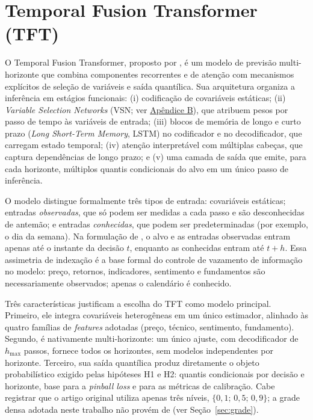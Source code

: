 \section{Temporal Fusion Transformer (TFT)} \label{sec:tft-teoria}
O Temporal Fusion Transformer, proposto por , é um modelo de previsão multi-horizonte que combina componentes recorrentes e de atenção com mecanismos explícitos de seleção de variáveis e saída quantílica. Sua arquitetura organiza a inferência em estágios funcionais: (i) codificação de covariáveis estáticas; (ii) \textit{Variable Selection Networks} (VSN; ver \hyperref[gl:vsn]{Apêndice B}), que atribuem pesos por passo de tempo às variáveis de entrada; (iii) blocos de memória de longo e curto prazo (\textit{Long Short-Term Memory}, LSTM) no codificador e no decodificador, que carregam estado temporal; (iv) atenção interpretável com múltiplas cabeças, que captura dependências de longo prazo; e (v) uma camada de saída que emite, para cada horizonte, múltiplos quantis condicionais do alvo em um único passo de inferência.

O modelo distingue formalmente três tipos de entrada: covariáveis estáticas; entradas \textit{observadas}, que só podem ser medidas a cada passo e são desconhecidas de antemão; e entradas \textit{conhecidas}, que podem ser predeterminadas (por exemplo, o dia da semana). Na formulação de , o alvo e as entradas observadas entram apenas até o instante da decisão \(t\), enquanto as conhecidas entram até \(t+h\). Essa assimetria de indexação é a base formal do controle de vazamento de informação no modelo: preço, retornos, indicadores, sentimento e fundamentos são necessariamente observados; apenas o calendário é conhecido.

Três características justificam a escolha do TFT como modelo principal. Primeiro, ele integra covariáveis heterogêneas em um único estimador, alinhado às quatro famílias de \textit{features} adotadas (preço, técnico, sentimento, fundamento). Segundo, é nativamente multi-horizonte: um único ajuste, com decodificador de \(h_{\max}\) passos, fornece todos os horizontes, sem modelos independentes por horizonte. Terceiro, sua saída quantílica produz diretamente o objeto probabilístico exigido pelas hipóteses H1 e H2: quantis condicionais por decisão e horizonte, base para a \textit{pinball loss} e para as métricas de calibração. Cabe registrar que o artigo original utiliza apenas três níveis, \(\{0{,}1;\,0{,}5;\,0{,}9\}\); a grade densa adotada neste trabalho não provém de  (ver Seção~\ref{sec:grade}).

